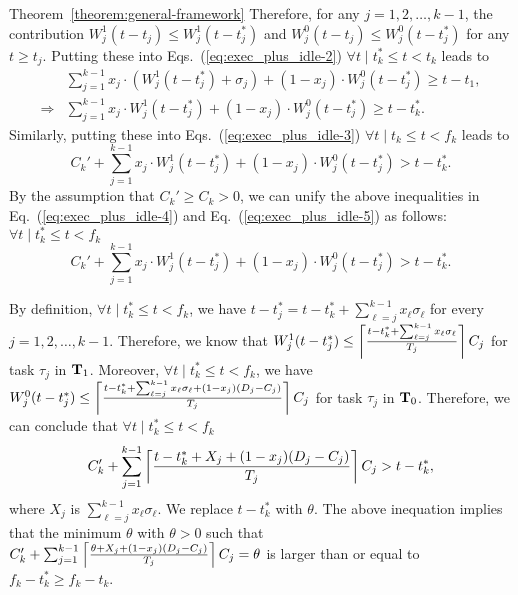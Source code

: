 \begin{appProof}{Theorem~\ref{theorem:general-framework}}
Therefore, for any $j=1,2,\ldots,k-1$, the contribution $W_j^1(t-t_j)
\leq W_j^1(t-t_j^*)$ and $W_j^0(t-t_j) \leq W_j^0(t-t_j^*)$ for any $t
\geq t_j$. Putting these into 
Eqs.~(\ref{eq:exec_plus_idle-2}) $\forall t \mid t_k^* \leq t < t_k$ leads to
{\small \begin{align}
&\sum_{j=1}^{k-1} x_j\cdot (W_j^1(t-t_j^*)+\sigma_j) + (1-x_j)\cdot W_j^0(t-t_j^*) \geq t-t_1,\nonumber\\
\Rightarrow& \sum_{j=1}^{k-1} x_j\cdot W_j^1(t-t_j^*) + (1-x_j)\cdot W_j^0(t-t_j^*) \geq t-t_k^*.
\label{eq:exec_plus_idle-4}
\end{align}}
Similarly, putting these into 
Eqs.~(\ref{eq:exec_plus_idle-3}) $\forall t \mid t_k \leq t < f_k$ leads to 
\begin{equation}
\label{eq:exec_plus_idle-5}
C_k'+\sum_{j=1}^{k-1} x_j\cdot W_j^1(t-t_j^*) + (1-x_j)\cdot W_j^0(t-t_j^*) > t-t_k^*.
\end{equation}
 By the assumption that $C_k' \geq C_k > 0$, we can unify the above inequalities in Eq.~(\ref{eq:exec_plus_idle-4}) and Eq.~(\ref{eq:exec_plus_idle-5}) as follows:
$\forall t \mid t_k^* \leq t < f_k$
\begin{equation}
\label{eq:exec_plus_idle-almost-final} 
C_k'+\sum_{j=1}^{k-1} x_j\cdot W_j^1(t-t_j^*) + (1-x_j)\cdot W_j^0(t-t_j^*) > t-t_k^*.
\end{equation}



By definition, $\forall t \mid t_k^* \leq t < f_k$, we have
$t-t_j^* = t - t_k^* + \sum_{\ell=j}^{k-1} x_\ell\sigma_\ell$ for every
$j=1,2,\ldots,k-1$. Therefore, we know that
 $W_j^1(t-t_j^*) \leq
\left\lceil{\frac{t-t_k^* +\sum_{\ell=j}^{k-1} x_\ell\sigma_\ell}{T_j}}\right\rceil C_j$ for task $\tau_j$ in ${\bf T}_1$. Moreover, 
$\forall t
\mid t_k^* \leq t < f_k$, we have $W_j^0(t-t_j^*) \leq
\left\lceil{\frac{t-t_k^*+\sum_{\ell=j}^{k-1} x_\ell\sigma_\ell + (1-x_j)(D_j-C_j)}{T_j}}\right\rceil C_j$
for task $\tau_j$ in ${\bf T}_0$. Therefore, we can conclude that 
$\forall t \mid t_k^* \leq t < f_k$
\begin{equation}
C_k'+\sum_{j=1}^{k-1} \left\lceil{\frac{t-t_k^*+X_j+(1-x_j)(D_j-C_j)}{T_j}}\right\rceil C_j > t-t_k^*,
\end{equation}
where $X_j$ is $\sum_{\ell=j}^{k-1} x_\ell\sigma_\ell$. We replace $t-t_k^*$ with $\theta$. 
The above inequation implies that the minimum $\theta$ with $\theta > 0$ such that
$C_k'+\sum_{j=1}^{k-1} \left\lceil{\frac{\theta+X_j+(1-x_j)(D_j-C_j)}{T_j}}\right\rceil C_j = \theta$
 is larger than or equal to $f_k-t_k^* \geq f_k-t_k$. 


\end{appProof}
